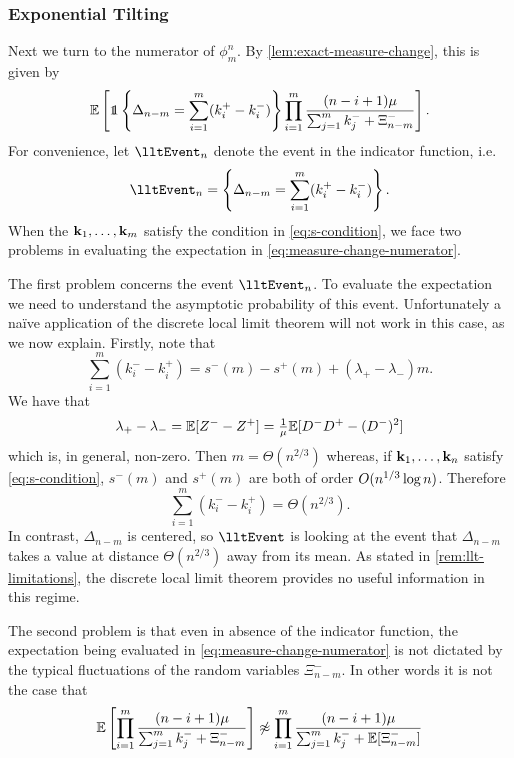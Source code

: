 \subsubsection{Exponential Tilting}

Next we turn to the numerator of $\phi^n_m$. By \cref{lem:exact-measure-change}, this is given by
\begin{equation}
    \label{eq:measure-change-numerator}
    \E\left[ 
        \one \left\{ \Delta_{n-m} = \sum_{i=1}^m (k_i^+ - k_i^-) \right\}
        \prod_{i=1}^m \frac{(n - i + 1) \mu}{\sum_{j=1}^m k_j^- + \Xi_{n-m}^-}
    \right].
\end{equation}
For convenience, let $\lltEvent_n$ denote the event in the indicator function, i.e.
\begin{equation*}
    \lltEvent_n = \left\{ \Delta_{n-m} = \sum_{i=1}^m (k_i^+ - k_i^-) \right\}.
\end{equation*}
When the ${\mathbf k}_1, \ldots, {\mathbf k}_m$ satisfy the condition in \cref{eq:s-condition}, we face two problems in evaluating the expectation in \cref{eq:measure-change-numerator}.


The first problem concerns the event $\lltEvent_n$. To evaluate the expectation we need to understand the asymptotic probability of this event. Unfortunately a naïve application of the discrete local limit theorem will not work in this case, as we now explain. Firstly, note that
\begin{equation*}
    \sum_{i=1}^m (k_i^- - k_i^+) = s^-(m) - s^+(m) + (\lambda_+ - \lambda_-) m.
\end{equation*}
We have that
\begin{equation*}
    \lambda_+ - \lambda_- = {\mathbb E}[Z^- - Z^+] = \tfrac{1}{\mu} {\mathbb E}[D^-D^+ - (D^-)^2]
\end{equation*}
which is, in general, non-zero. Then $m = \Theta(n^{2/3})$ whereas, if ${\mathbf k}_1, \ldots, {\mathbf k}_n$ satisfy \cref{eq:s-condition}, $s^{-}(m)$ and $s^+(m)$ are both of order $O(n^{1/3} \log n)$. Therefore
\begin{equation*}
    \sum_{i=1}^m (k_i^- - k_i^+) = \Theta(n^{2/3}).
\end{equation*}
In contrast, $\Delta_{n-m}$ is centered, so $\lltEvent$ is looking at the event that $\Delta_{n-m}$ takes a value at distance $\Theta(n^{2/3})$ away from its mean. As stated in \cref{rem:llt-limitations}, the discrete local limit theorem provides no useful information in this regime. 

The second problem is that even in absence of the indicator function, the expectation being evaluated in \cref{eq:measure-change-numerator} is not dictated by the typical fluctuations of the random variables $\Xi^-_{n-m}$. In other words it is not the case that
\begin{equation}
    {\mathbb E}\left[ 
        \prod_{i=1}^m \frac{(n - i + 1) \mu}{\sum_{j=1}^m k_j^- + \Xi_{n-m}^-}
    \right]
    \not \approx
    \prod_{i=1}^m \frac{(n - i + 1) \mu}{\sum_{j=1}^m k_j^- + {\mathbb E}[\Xi_{n-m}^-]}
\end{equation}

